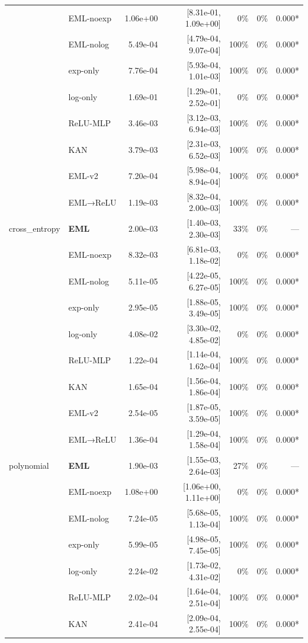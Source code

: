 \begin{table}[t]
\begin{tabular}{llrrrrr}
 & EML-noexp & 1.06e+00 & [8.31e-01, 1.09e+00] & 0\% & 0\% & 0.000* \\
 & EML-nolog & 5.49e-04 & [4.79e-04, 9.07e-04] & 100\% & 0\% & 0.000* \\
 & exp-only & 7.76e-04 & [5.93e-04, 1.01e-03] & 100\% & 0\% & 0.000* \\
 & log-only & 1.69e-01 & [1.29e-01, 2.52e-01] & 0\% & 0\% & 0.000* \\
 & ReLU-MLP & 3.46e-03 & [3.12e-03, 6.94e-03] & 100\% & 0\% & 0.000* \\
 & KAN & 3.79e-03 & [2.31e-03, 6.52e-03] & 100\% & 0\% & 0.000* \\
 & EML-v2 & 7.20e-04 & [5.98e-04, 8.94e-04] & 100\% & 0\% & 0.000* \\
 & EML→ReLU & 1.19e-03 & [8.32e-04, 2.00e-03] & 100\% & 0\% & 0.000* \\
\midrule
cross\_entropy & \textbf{EML} & 2.00e-03 & [1.40e-03, 2.30e-03] & 33\% & 0\% & — \\
 & EML-noexp & 8.32e-03 & [6.81e-03, 1.18e-02] & 0\% & 0\% & 0.000* \\
 & EML-nolog & 5.11e-05 & [4.22e-05, 6.27e-05] & 100\% & 0\% & 0.000* \\
 & exp-only & 2.95e-05 & [1.88e-05, 3.49e-05] & 100\% & 0\% & 0.000* \\
 & log-only & 4.08e-02 & [3.30e-02, 4.85e-02] & 0\% & 0\% & 0.000* \\
 & ReLU-MLP & 1.22e-04 & [1.14e-04, 1.62e-04] & 100\% & 0\% & 0.000* \\
 & KAN & 1.65e-04 & [1.56e-04, 1.86e-04] & 100\% & 0\% & 0.000* \\
 & EML-v2 & 2.54e-05 & [1.87e-05, 3.59e-05] & 100\% & 0\% & 0.000* \\
 & EML→ReLU & 1.36e-04 & [1.29e-04, 1.58e-04] & 100\% & 0\% & 0.000* \\
\midrule
polynomial & \textbf{EML} & 1.90e-03 & [1.55e-03, 2.64e-03] & 27\% & 0\% & — \\
 & EML-noexp & 1.08e+00 & [1.06e+00, 1.11e+00] & 0\% & 0\% & 0.000* \\
 & EML-nolog & 7.24e-05 & [5.68e-05, 1.13e-04] & 100\% & 0\% & 0.000* \\
 & exp-only & 5.99e-05 & [4.98e-05, 7.45e-05] & 100\% & 0\% & 0.000* \\
 & log-only & 2.24e-02 & [1.73e-02, 4.31e-02] & 0\% & 0\% & 0.000* \\
 & ReLU-MLP & 2.02e-04 & [1.64e-04, 2.51e-04] & 100\% & 0\% & 0.000* \\
 & KAN & 2.41e-04 & [2.09e-04, 2.55e-04] & 100\% & 0\% & 0.000* \\

\end{tabular}
\end{table}
